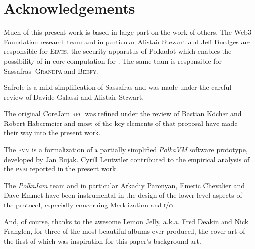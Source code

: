 \section{Acknowledgements}

Much of this present work is based in large part on the work of others. The Web3 Foundation research team and in particular Alistair Stewart and Jeff Burdges are responsible for \textsc{Elves}, the security apparatus of Polkadot which enables the possibility of in-core computation for \Jam. The same team is responsible for Sassafras, \textsc{Grandpa} and \textsc{Beefy}.    

Safrole is a mild simplification of Sassafras and was made under the careful review of Davide Galassi and Alistair Stewart.

The original CoreJam \textsc{rfc} was refined under the review of Bastian Köcher and Robert Habermeier and most of the key elements of that proposal have made their way into the present work.

The \textsc{pvm} is a formalization of a partially simplified \emph{PolkaVM} software prototype, developed by Jan Bujak. Cyrill Leutwiler contributed to the empirical analysis of the \textsc{pvm} reported in the present work.

The \emph{PolkaJam} team and in particular Arkadiy Paronyan, Emeric Chevalier and Dave Emmet have been instrumental in the design of the lower-level aspects of the \Jam protocol, especially concerning Merklization and \textsc{i/o}.

And, of course, thanks to the awesome Lemon Jelly, a.k.a. Fred Deakin and Nick Franglen, for three of the most beautiful albums ever produced, the cover art of the first of which was inspiration for this paper's background art.